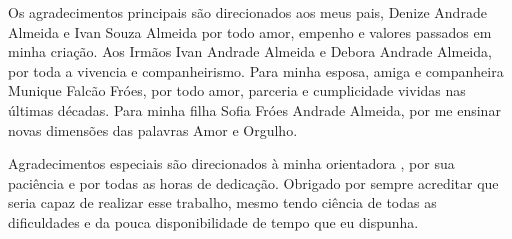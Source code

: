

\begin{agradecimentos}
Os agradecimentos principais são direcionados aos meus pais, Denize Andrade Almeida e Ivan Souza Almeida por todo amor, empenho e valores passados em minha criação. Aos Irmãos Ivan Andrade Almeida e Debora Andrade Almeida, por toda a vivencia e companheirismo. Para minha esposa, amiga e companheira Munique Falcão Fróes, por todo amor, parceria e cumplicidade vividas nas últimas décadas. Para minha filha Sofia Fróes Andrade Almeida, por me ensinar novas dimensões das palavras Amor e Orgulho.

Agradecimentos especiais são direcionados à minha orientadora \imprimirorientador, por sua paciência e por todas as horas de dedicação. Obrigado por sempre acreditar que seria capaz de realizar esse trabalho, mesmo tendo ciência de todas as dificuldades e da pouca disponibilidade de tempo que eu dispunha.

\end{agradecimentos}